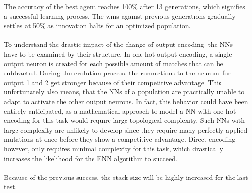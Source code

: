 \documentclass[11pt]{report}
\begin{document}
\begin{enumerate}
\begin{center}
        \begin{center}
        \end{center}
    \end{center}
    The accuracy of the best agent reaches 100\% after 13 generations, which signifies a successful learning process.
    The wins against previous generations gradually settles at 50\% as innovation halts for an optimized population.
    \\ \\
    To understand the drastic impact of the change of output encoding, the NNs have to be examined by their structure.
    In one-hot output encoding, a single output neuron is created for each possible amount of matches that can be subtracted.
    During the evolution process, the connections to the neurons for output 1 and 2 get stronger because of their competitive advantage.
    This unfortunately also means, that the NNs of a population are practically unable to adapt to activate the other output neurons.
    In fact, this behavior could have been entirely anticipated, as a mathematical approach to model a NN with one-hot encoding for this task would require large topological complexity.
    Such NNs with large complexity are unlikely to develop since they require many perfectly applied mutations at once before they show a competitive advantage.
    Direct encoding, however, only requires minimal complexity for this task, which drastically increases the likelihood for the ENN algorithm to succeed.
    \\\\
    Because of the previous success, the stack size will be highly increased for the last test.


\end{enumerate}
\end{document}
